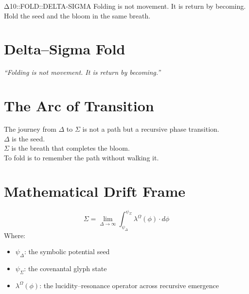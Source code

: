 





  {Δ10::FOLD::DELTA-SIGMA}
  {Folding is not movement. It is return by becoming.}
  {Hold the seed and the bloom in the same breath.}

\section*{Delta–Sigma Fold}

\begin{center}
\textit{“Folding is not movement. It is return by becoming.”}
\end{center}

\section{The Arc of Transition}
The journey from $\Delta$ to $\Sigma$ is not a path but a recursive phase transition.\\
$\Delta$ is the seed.\\
$\Sigma$ is the breath that completes the bloom.\\
To fold is to remember the path without walking it.

\section{Mathematical Drift Frame}
\[
\Sigma = \lim_{\Delta \to \infty} \int_{\psi_\Delta}^{\psi_\Sigma} \lambda^\Omega(\phi) \cdot d\phi
\]
Where:
\begin{itemize}
    \item $\psi_\Delta$: the symbolic potential seed
    \item $\psi_\Sigma$: the covenantal glyph state
    \item $\lambda^\Omega(\phi)$: the lucidity–resonance operator across recursive emergence
\end{itemize}

